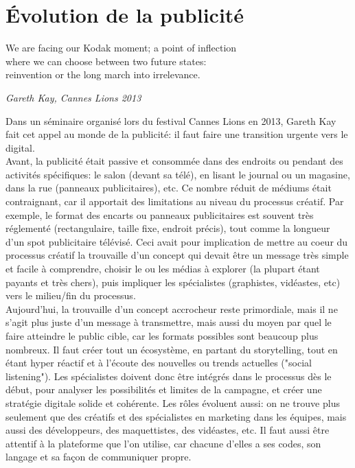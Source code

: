 \vspace{-1.2cm}

\section{Évolution de la publicité}

\epigraph{We are facing our Kodak moment; a point of inflection \\ where we can choose between two future states: \\ reinvention or the long march into irrelevance.}{\textit{Gareth Kay, Cannes Lions 2013}}

Dans un séminaire organisé lors du festival Cannes Lions en 2013, Gareth Kay fait cet appel au monde de la publicité: il faut faire une transition urgente vers le digital.\\

Avant, la publicité était passive et consommée dans des endroits ou pendant des activités spécifiques: le salon (devant sa télé), en lisant le journal ou un magasine, dans la rue (panneaux publicitaires), etc. Ce nombre réduit de médiums était contraignant, car il apportait des limitations au niveau du processus créatif. Par exemple, le format des encarts ou panneaux publicitaires est souvent très réglementé (rectangulaire, taille fixe, endroit précis), tout comme la longueur d'un spot publicitaire télévisé. Ceci avait pour implication de mettre au coeur du processus créatif la trouvaille d'un concept qui devait être un message très simple et facile à comprendre, choisir le ou les médias à explorer (la plupart étant payants et très chers), puis impliquer les spécialistes (graphistes, vidéastes, etc) vers le milieu/fin du processus. \\

Aujourd'hui, la trouvaille d'un concept accrocheur reste primordiale, mais il ne s'agit plus juste d'un message à transmettre, mais aussi du moyen par quel le faire atteindre le public cible, car les formats possibles sont beaucoup plus nombreux. Il faut créer tout un écosystème, en partant du storytelling, tout en étant hyper réactif et à l'écoute des nouvelles ou trends actuelles ("social listening"). Les spécialistes doivent donc être intégrés dans le processus dès le début, pour analyser les possibilités et limites de la campagne, et créer une stratégie digitale solide et cohérente. Les rôles évoluent aussi: on ne trouve plus seulement que des créatifs et des spécialistes en marketing dans les équipes, mais aussi des développeurs, des maquettistes, des vidéastes, etc. Il faut aussi être attentif à la plateforme que l'on utilise, car chacune d'elles a ses codes, son langage et sa façon de communiquer propre.\\

